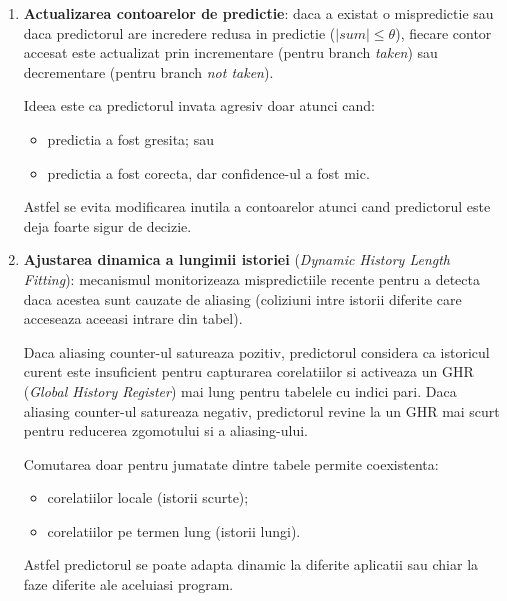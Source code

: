 \begin{enumerate}
    \item \textbf{Actualizarea contoarelor de predictie}: daca a existat
          o mispredictie sau daca predictorul are incredere redusa in
          predictie ($|\mathit{sum}| \leq \theta$), fiecare contor accesat
          este actualizat prin incrementare (pentru branch \textit{taken})
          sau decrementare (pentru branch \textit{not taken}).

          Ideea este ca predictorul invata agresiv doar atunci cand:
          \begin{itemize}
              \item predictia a fost gresita; sau
              \item predictia a fost corecta, dar confidence-ul a fost mic.
          \end{itemize}

          Astfel se evita modificarea inutila a contoarelor atunci cand
          predictorul este deja foarte sigur de decizie.

    \item \textbf{Ajustarea dinamica a lungimii istoriei}
          (\textit{Dynamic History Length Fitting}): mecanismul monitorizeaza
          mispredictiile recente pentru a detecta daca acestea sunt cauzate
          de aliasing (coliziuni intre istorii diferite care acceseaza
          aceeasi intrare din tabel).

          Daca aliasing counter-ul satureaza pozitiv, predictorul considera
          ca istoricul curent este insuficient pentru capturarea corelatiilor
          si activeaza un GHR (\textit{Global History Register}) mai lung
          pentru tabelele cu indici pari. Daca aliasing counter-ul satureaza
          negativ, predictorul revine la un GHR mai scurt pentru reducerea
          zgomotului si a aliasing-ului.

          Comutarea doar pentru jumatate dintre tabele permite coexistenta:
          \begin{itemize}
              \item corelatiilor locale (istorii scurte);
              \item corelatiilor pe termen lung (istorii lungi).
          \end{itemize}

          Astfel predictorul se poate adapta dinamic la diferite aplicatii
          sau chiar la faze diferite ale aceluiasi program.


\end{enumerate}
